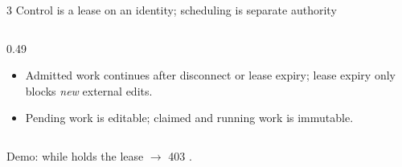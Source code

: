 \begin{frame}{3 \quad Control is a lease on an identity; scheduling is separate authority}
\begin{columns}[T]
\begin{column}{0.49\textwidth}
\begin{block}{\vtwo{}}
\begin{itemize}
                          admitted operations. That record, not the lease, authorizes the scheduler.
                    \item Admitted work continues after disconnect or lease expiry; lease expiry only
                          blocks \emph{new} external edits. 
                    \item Pending work is editable; claimed and running work is immutable.
                \end{itemize}
            \end{block}
        \end{column}
    \end{columns}
    \vspace{0.1cm}
    {\footnotesize\color{qsgray} Demo:  while  holds the lease $\rightarrow$ 403
    .\par}
\end{frame}


